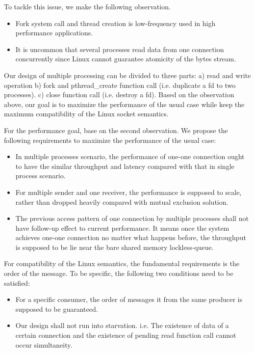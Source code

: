To tackle this issue, we make the following observation.
\begin{itemize}
	\item Fork system call and thread creation is low-frequency used in high performance applications.
	\item It is uncommon that several processes read data from one connection concurrently since Linux cannot guarantee atomicity of the bytes stream.
\end{itemize} 

Our design of multiple processing can be divided to three parts: a) read and write operation b) fork and pthread\_create function call (i.e. duplicate a fd to two processes). c) close function call (i.e. destroy a fd). Based on the observation above, our goal is to maximize the performance of the usual case while keep the maximum compatibility of the Linux socket semantics.

For the performance goal, base on the second observation. We propose the following requirements to maximize the performance of the usual case:
\begin{itemize}
 \item In multiple processes scenario, the performance of one-one connection ought to have the similar throughput and latency compared with that in single process scenario.
 \item For multiple sender and one receiver, the performance is supposed to scale, rather than dropped heavily compared with mutual exclusion solution.
 \item The previous access pattern of one connection by multiple processes shall not have follow-up effect to current performance. It means once the system achieves one-one connection no matter what happens before, the throughput is supposed to be lie near the bare shared memory lockless-queue.
\end{itemize}

For compatibility of the Linux semantics, the fundamental requirements is the order of the message. To be specific, the following two conditions need to be satisfied:
\begin{itemize}
\item For a specific consumer, the order of messages it from the same producer is supposed to be guaranteed.
\item Our design shall not run into starvation. i.e. The existence of data of a certain connection and the existence of pending read function call cannot occur simultaneity.
\end{itemize}



